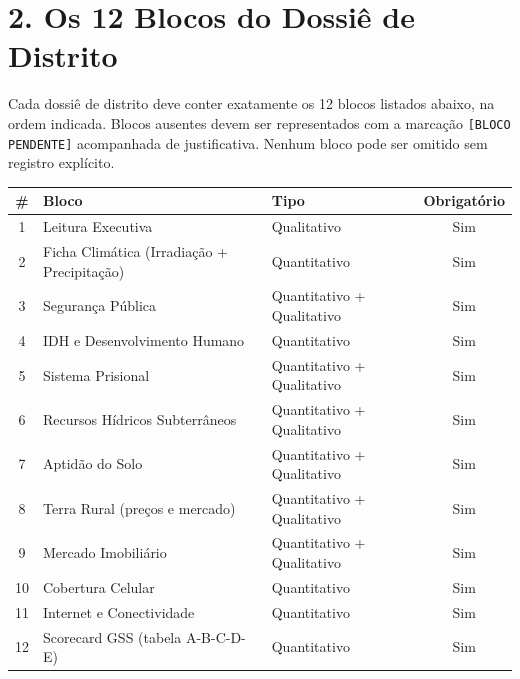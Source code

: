 \section*{2. Os 12 Blocos do Dossiê de Distrito}

Cada dossiê de distrito deve conter exatamente os 12 blocos listados abaixo, na ordem indicada. Blocos ausentes devem ser representados com a marcação \texttt{[BLOCO PENDENTE]} acompanhada de justificativa. Nenhum bloco pode ser omitido sem registro explícito.

\bigskip

\begin{tabularx}{\linewidth}{|c|X|l|c|}
\hline
\textbf{\#} & \textbf{Bloco} & \textbf{Tipo} & \textbf{Obrigatório} \\
\hline
1  & Leitura Executiva                                & Qualitativo                   & Sim \\
\hline
2  & Ficha Climática (Irradiação + Precipitação)      & Quantitativo                  & Sim \\
\hline
3  & Segurança Pública                                & Quantitativo + Qualitativo    & Sim \\
\hline
4  & IDH e Desenvolvimento Humano                     & Quantitativo                  & Sim \\
\hline
5  & Sistema Prisional                                & Quantitativo + Qualitativo    & Sim \\
\hline
6  & Recursos Hídricos Subterrâneos                   & Quantitativo + Qualitativo    & Sim \\
\hline
7  & Aptidão do Solo                                  & Quantitativo + Qualitativo    & Sim \\
\hline
8  & Terra Rural (preços e mercado)                   & Quantitativo + Qualitativo    & Sim \\
\hline
9  & Mercado Imobiliário                              & Quantitativo + Qualitativo    & Sim \\
\hline
10 & Cobertura Celular                                & Quantitativo                  & Sim \\
\hline
11 & Internet e Conectividade                         & Quantitativo                  & Sim \\
\hline
12 & Scorecard GSS (tabela A-B-C-D-E)                 & Quantitativo                  & Sim \\
\hline
\end{tabularx}


